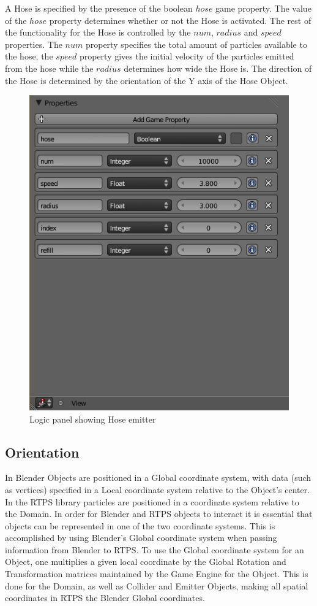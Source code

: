 A Hose is specified by the presence of the boolean $hose$ game property. The
value of the $hose$ property determines whether or not the Hose is activated.
The rest of the functionality for the Hose is controlled by the $num$, $radius$
and $speed$ properties. The $num$ property specifies the total amount of
particles available to the hose, the $speed$ property gives the initial
velocity of the particles emitted from the hose while the $radius$ determines
how wide the Hose is. The direction of the Hose is determined by the
orientation of the Y axis of the Hose Object.

\begin{figure}[!htc]
 		\centering
		\includegraphics[scale=0.6]{figures/ui_hose.png}
        \caption{ Logic panel showing Hose emitter }
		\label{fig:ui_emitter}
\end{figure}

\subsection{Orientation}
In Blender Objects are positioned in a Global coordinate system, with data
(such as vertices) specified in a Local coordinate system relative to the
Object's center. In the RTPS library particles are positioned in a coordinate
system relative to the Domain. In order for Blender and RTPS objects to
interact it is essential that objects can be represented in one of the two
coordinate systems. This is accomplished by using Blender's Global coordinate
system when passing information from Blender to RTPS. To use the Global
coordinate system for an Object, one multiplies a given local coordinate by the
Global Rotation and Transformation matrices maintained by the Game Engine for
the Object. This is done for the Domain, as well as Collider and Emitter
Objects, making all spatial coordinates in RTPS the Blender Global coordinates.

